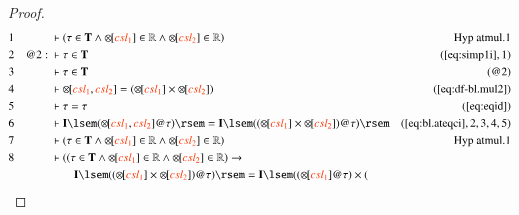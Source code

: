 \begin{proof}
\begin{align}
  1 &&  & \vdash ( \tau \in \mathbf{T} \wedge {\otimes\hspace{-1pt}[}
      \msc{csl_1} ] \in \mathbb{R} \wedge
      {\otimes\hspace{-1pt}[} \msc{csl_2} ] \in \mathbb{R}
      )&\text{Hyp~atmul.1}\notag%
  \\ 2 && @2:\  & \vdash \tau \in \mathbf{T}&(\mbox{\ref{eq:simp1i}},1)\notag
  \\ 3 &&  & \vdash \tau \in \mathbf{T}&(@2)\notag
  \\ 4 &&  & \vdash {\otimes\hspace{-1pt}[} \msc{csl_1} , \msc{csl_2} ] = (
      {\otimes\hspace{-1pt}[} \msc{csl_1} ] \times
      {\otimes\hspace{-1pt}[} \msc{csl_2} ]
      )&(\mbox{\ref{eq:df-bl.mul2}})\notag
  \\ 5 &&  & \vdash \tau = \tau&(\mbox{\ref{eq:eqid}})\notag
  \\ 6 &&  & \vdash \mathbf{I} \lsem ( {\otimes\hspace{-1pt}[} \msc{csl_1} ,
      \msc{csl_2} ] @ \tau ) \rsem = \mathbf{I} \lsem ( (
      {\otimes\hspace{-1pt}[} \msc{csl_1} ] \times
      {\otimes\hspace{-1pt}[} \msc{csl_2} ] ) @ \tau )
      \rsem&(\mbox{\ref{eq:bl.ateqci}},2,3,4,5)\notag
  \\ 7 &&  & \vdash ( \tau \in \mathbf{T} \wedge {\otimes\hspace{-1pt}[}
      \msc{csl_1} ] \in \mathbb{R} \wedge
      {\otimes\hspace{-1pt}[} \msc{csl_2} ] \in \mathbb{R}
      )&\text{Hyp~atmul.1}\notag%
  \\ 8 &&  & \vdash ( ( \tau \in \mathbf{T} \wedge {\otimes\hspace{-1pt}[}
      \msc{csl_1} ] \in \mathbb{R} \wedge
      {\otimes\hspace{-1pt}[} \msc{csl_2} ] \in \mathbb{R}
      ) \rightarrow \notag \\ & & & \qquad
       \mathbf{I} \lsem ( (
      {\otimes\hspace{-1pt}[} \msc{csl_1} ] \times
      {\otimes\hspace{-1pt}[} \msc{csl_2} ] ) @ \tau )
      \rsem = \mathbf{I} \lsem ( ( {\otimes\hspace{-1pt}[}
      \msc{csl_1} ] @ \tau ) \times (

\end{align}
\end{proof}
